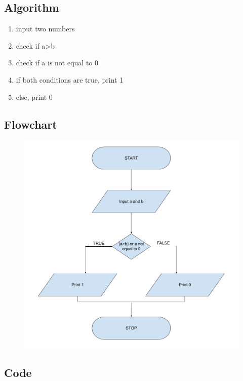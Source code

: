 \documentclass[12pt]{article}
\begin{document}
\subsection{Algorithm}
\begin{enumerate}
    \item input two numbers
    \item check if a>b
    \item check if a is not equal to 0
    \item if both conditions are true, print 1
    \item else, print 0
\end{enumerate}
\subsection{Flowchart}
\begin{figure}[h]
    \centering
    \includegraphics[width=1.0\textwidth]{Flowchart04e.png}
\end{figure}
\newpage
\subsection{Code}
\inputminted{c}{q4e.c}
\end{document}
